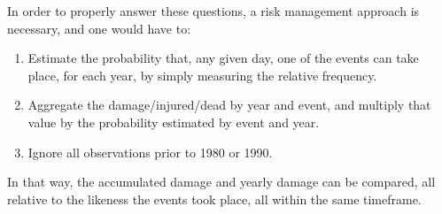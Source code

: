 \documentclass[
]{article}
\begin{document}
In order to properly answer these questions, a risk management approach
is necessary, and one would have to:

\begin{enumerate}
\def\labelenumi{(\arabic{enumi})}
\item
  Estimate the probability that, any given day, one of the events can
  take place, for each year, by simply measuring the relative frequency.
\item
  Aggregate the damage/injured/dead by year and event, and multiply that
  value by the probability estimated by event and year.
\item
  Ignore all observations prior to 1980 or 1990.
\end{enumerate}

In that way, the accumulated damage and yearly damage can be compared,
all relative to the likeness the events took place, all within the same
timeframe.
\end{document}
